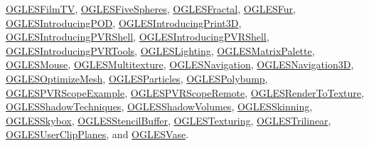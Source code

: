 \hyperlink{class_o_g_l_e_s_film_t_v}{O\+G\+L\+E\+S\+Film\+T\+V}, \hyperlink{class_o_g_l_e_s_five_spheres}{O\+G\+L\+E\+S\+Five\+Spheres}, \hyperlink{class_o_g_l_e_s_fractal}{O\+G\+L\+E\+S\+Fractal}, \hyperlink{class_o_g_l_e_s_fur}{O\+G\+L\+E\+S\+Fur}, \hyperlink{class_o_g_l_e_s_introducing_p_o_d}{O\+G\+L\+E\+S\+Introducing\+P\+O\+D}, \hyperlink{class_o_g_l_e_s_introducing_print3_d}{O\+G\+L\+E\+S\+Introducing\+Print3\+D}, \hyperlink{class_o_g_l_e_s_introducing_p_v_r_shell}{O\+G\+L\+E\+S\+Introducing\+P\+V\+R\+Shell}, \hyperlink{class_o_g_l_e_s_introducing_p_v_r_shell}{O\+G\+L\+E\+S\+Introducing\+P\+V\+R\+Shell}, \hyperlink{class_o_g_l_e_s_introducing_p_v_r_tools}{O\+G\+L\+E\+S\+Introducing\+P\+V\+R\+Tools}, \hyperlink{class_o_g_l_e_s_lighting}{O\+G\+L\+E\+S\+Lighting}, \hyperlink{class_o_g_l_e_s_matrix_palette}{O\+G\+L\+E\+S\+Matrix\+Palette}, \hyperlink{class_o_g_l_e_s_mouse}{O\+G\+L\+E\+S\+Mouse}, \hyperlink{class_o_g_l_e_s_multitexture}{O\+G\+L\+E\+S\+Multitexture}, \hyperlink{class_o_g_l_e_s_navigation}{O\+G\+L\+E\+S\+Navigation}, \hyperlink{class_o_g_l_e_s_navigation3_d}{O\+G\+L\+E\+S\+Navigation3\+D}, \hyperlink{class_o_g_l_e_s_optimize_mesh}{O\+G\+L\+E\+S\+Optimize\+Mesh}, \hyperlink{class_o_g_l_e_s_particles}{O\+G\+L\+E\+S\+Particles}, \hyperlink{class_o_g_l_e_s_polybump}{O\+G\+L\+E\+S\+Polybump}, \hyperlink{class_o_g_l_e_s_p_v_r_scope_example}{O\+G\+L\+E\+S\+P\+V\+R\+Scope\+Example}, \hyperlink{class_o_g_l_e_s_p_v_r_scope_remote}{O\+G\+L\+E\+S\+P\+V\+R\+Scope\+Remote}, \hyperlink{class_o_g_l_e_s_render_to_texture}{O\+G\+L\+E\+S\+Render\+To\+Texture}, \hyperlink{class_o_g_l_e_s_shadow_techniques}{O\+G\+L\+E\+S\+Shadow\+Techniques}, \hyperlink{class_o_g_l_e_s_shadow_volumes}{O\+G\+L\+E\+S\+Shadow\+Volumes}, \hyperlink{class_o_g_l_e_s_skinning}{O\+G\+L\+E\+S\+Skinning}, \hyperlink{class_o_g_l_e_s_skybox}{O\+G\+L\+E\+S\+Skybox}, \hyperlink{class_o_g_l_e_s_stencil_buffer}{O\+G\+L\+E\+S\+Stencil\+Buffer}, \hyperlink{class_o_g_l_e_s_texturing}{O\+G\+L\+E\+S\+Texturing}, \hyperlink{class_o_g_l_e_s_trilinear}{O\+G\+L\+E\+S\+Trilinear}, \hyperlink{class_o_g_l_e_s_user_clip_planes}{O\+G\+L\+E\+S\+User\+Clip\+Planes}, and \hyperlink{class_o_g_l_e_s_vase}{O\+G\+L\+E\+S\+Vase}.

